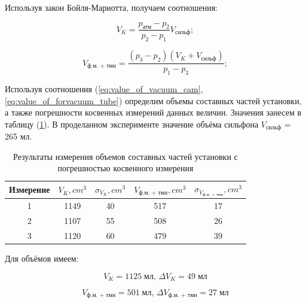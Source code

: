 \documentclass[a4paper, 12pt]{article} %
\begin{document}
Используя закон Бойля-Мариотта, получаем соотношения:

\begin{equation}
        V_{K} = \frac{p_{\text{атм}} - p_{2}}{p_{2} - p_{1}} V_{\text{сильф}};
        \label{eq:value_of_vacuum_cam}
\end{equation}
    
\begin{equation}
        V_{\text{ф.м. + тмн}} = \frac{ \left( p_{3} - p_{2}\right) \left( V_{K} + V_{\text{сильф}}\right) }{p_{1} - p_{3}};
        \label{eq:value_of_forvacuum_tube}
\end{equation}

Используя соотношения (\ref{eq:value_of_vacuum_cam}, \ref{eq:value_of_forvacuum_tube}) определим объемы составных частей установки, а также погрешности косвенных измерений данных величин. Значения занесем в таблицу (\ref{tab:resultsof_measuring_for_diffrent_part_value}). В проделанном эксперименте значение объёма сильфона $V_{\text{сильф}}$ = 265 мл.

\begin{table}[h]
    \begin{center}
        \begin{tabular}{|c|c|c|c|c|}
        \hline
        Измерение & $V_{K}, cm^{3}$ & $\sigma_{V_{K}}, cm^{3}$ & $V_{\text{ф.м. + тмн}}, cm^{3}$ & $\sigma_{V_{\text{ф.м. + тмн}}}, cm^{3}$ \\ \hline
        1 & 1149 & 40 & 517 & 17 \\ \hline
        2 & 1107 & 55 & 508 & 26 \\ \hline
        3 & 1120 & 60 & 479 & 39 \\ \hline
        \end{tabular}
    \end{center}
    \caption{Результаты измерения объемов составных частей установки с погрешностью косвенного измерения}
                        \label{tab:resultsof_measuring_for_diffrent_part_value}
\end{table}

Для объёмов имеем:

\begin{equation}
    V_{K} = 1125 \; \text{мл, }	\Delta V_{K} = 49 \; \text{мл}
\end{equation}

\begin{equation}
    V_{\text{ф.м. + тмн}} = 501 \; \text{мл, }	\Delta V_{\text{ф.м. + тмн}} = 27 \; \text{мл}
\end{equation}
\end{document}
